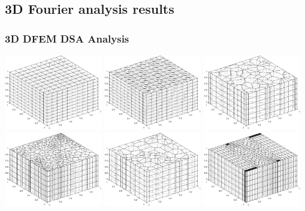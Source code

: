 \documentclass[compress,10pt]{beamer}
\begin{document}
\subsection{3D Fourier analysis results}
\begin{frame}[t]\frametitle{3D DFEM DSA Analysis}
\centering
\vspace{0.2cm}
\includegraphics[width=0.32\textwidth]{images/3D_cart_mesh.eps} 
\includegraphics[width=0.32\textwidth]{images/3D_tri_mesh.eps}
\includegraphics[width=0.32\textwidth]{images/3D_rand_poly_mesh.eps}  \\
\vspace{0.2cm}
\includegraphics[width=0.32\textwidth]{images/3D_shes_poly_mesh.eps} 
\includegraphics[width=0.32\textwidth]{images/3D_sine_poly_mesh.eps} 
\includegraphics[width=0.32\textwidth]{images/3D_z_poly_mesh.eps} 
\end{frame}
\end{document}
